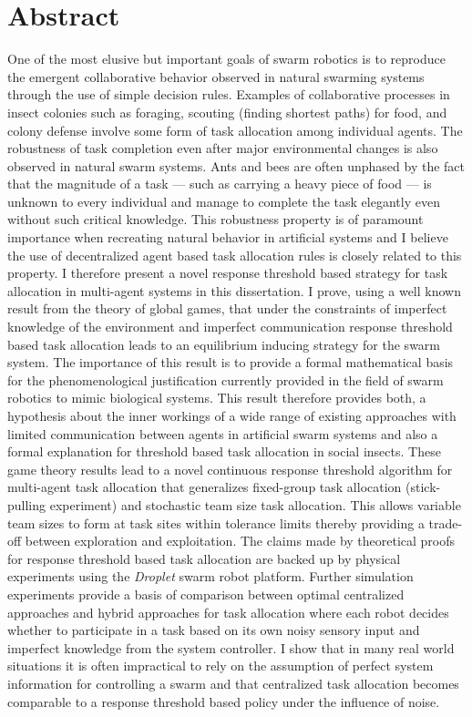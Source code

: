 \documentclass[12pt]{book}
\begin{document}
\chapter*{Abstract}
One of the most elusive but important goals of swarm robotics is to reproduce the emergent collaborative behavior observed in natural swarming systems through the use of simple decision rules. Examples of collaborative processes in insect colonies such as foraging, scouting (finding shortest paths) for food, and colony defense involve some form of task allocation among individual agents. The robustness of task completion even after major environmental changes is also observed in natural swarm systems. Ants and bees are often unphased by the fact that the magnitude of a task --- such as carrying a heavy piece of food --- is unknown to every individual and manage to complete the task elegantly even without such critical knowledge. This robustness property is of paramount importance when recreating natural behavior in artificial systems and I believe the use of decentralized agent based task allocation rules is closely related to this property. I therefore present a novel response threshold based strategy for task allocation in multi-agent systems in this dissertation. I prove, using a well known result from the theory of global games, that under the constraints of imperfect knowledge of the environment and imperfect communication response threshold based task allocation leads to an equilibrium inducing strategy for the swarm system. The importance of this result is to provide a formal mathematical basis for the phenomenological justification currently provided in the field of swarm robotics to mimic biological systems. This result therefore provides both, a hypothesis about the inner workings of a wide range of existing approaches with limited communication between agents in artificial swarm systems and also a formal explanation for threshold based task allocation in social insects. These game theory results lead to a novel continuous response threshold algorithm for multi-agent task allocation that generalizes fixed-group task allocation (stick-pulling experiment) and stochastic team size task allocation. This allows variable team sizes to form at task sites within tolerance limits thereby providing a trade-off between exploration and exploitation. The claims made by theoretical proofs for response threshold based task allocation are backed up by physical experiments using the \emph{Droplet} swarm robot platform. Further simulation experiments provide a basis of comparison between optimal centralized approaches and hybrid approaches for task allocation where each robot decides whether to participate in a task based on its own noisy sensory input and imperfect knowledge from the system controller. I show that in many real world situations it is often impractical to rely on the assumption of perfect system information for controlling a swarm and that centralized task allocation becomes comparable to a response threshold based policy under the influence of noise.
\end{document}
